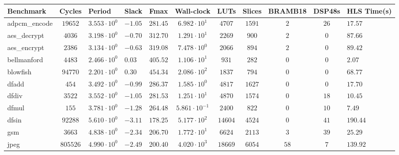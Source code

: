 \begin{tabular}{|l|c|HHc|c|c|c|c|cH|}
\hline
Benchmark     & Cycles       & Period                 & Slack     & Fmax       & Wall-clock              & LUTs      & Slices    & BRAMB18 & DSP48s  & HLS Time(s) \\
\hline
adpcm\_encode & $ 19652    $ & $ 3.553 \cdot 10^{0} $ & $ -1.05 $ & $ 281.45 $ & $ 6.982 \cdot 10^{1}  $ & $ 4707  $ & $ 1591  $ & $ 2   $ & $ 26  $ & $ 17.57   $ \\
aes\_decrypt  & $ 4036     $ & $ 3.198 \cdot 10^{0} $ & $ -0.70 $ & $ 312.70 $ & $ 1.291 \cdot 10^{1}  $ & $ 2269  $ & $ 900   $ & $ 2   $ & $ 0   $ & $ 87.66   $ \\
aes\_encrypt  & $ 2386     $ & $ 3.134 \cdot 10^{0} $ & $ -0.63 $ & $ 319.08 $ & $ 7.478 \cdot 10^{0}  $ & $ 2066  $ & $ 894   $ & $ 2   $ & $ 0   $ & $ 89.42   $ \\
bellmanford   & $ 4483     $ & $ 2.466 \cdot 10^{0} $ & $ 0.03  $ & $ 405.52 $ & $ 1.106 \cdot 10^{1}  $ & $ 931   $ & $ 282   $ & $ 0   $ & $ 0   $ & $ 2.07    $ \\
blowfish      & $ 94770    $ & $ 2.201 \cdot 10^{0} $ & $ 0.30  $ & $ 454.34 $ & $ 2.086 \cdot 10^{2}  $ & $ 1837  $ & $ 794   $ & $ 0   $ & $ 0   $ & $ 68.77   $ \\
dfadd         & $ 454      $ & $ 3.492 \cdot 10^{0} $ & $ -0.99 $ & $ 286.37 $ & $ 1.585 \cdot 10^{0}  $ & $ 4817  $ & $ 1627  $ & $ 0   $ & $ 0   $ & $ 17.70   $ \\
dfdiv         & $ 3522     $ & $ 3.552 \cdot 10^{0} $ & $ -1.05 $ & $ 281.53 $ & $ 1.251 \cdot 10^{1}  $ & $ 4870  $ & $ 1574  $ & $ 0   $ & $ 18  $ & $ 10.45   $ \\
dfmul         & $ 155      $ & $ 3.781 \cdot 10^{0} $ & $ -1.28 $ & $ 264.48 $ & $ 5.861 \cdot 10^{-1} $ & $ 2400  $ & $ 822   $ & $ 0   $ & $ 10  $ & $ 7.49    $ \\
dfsin         & $ 92288    $ & $ 5.610 \cdot 10^{0} $ & $ -3.11 $ & $ 178.25 $ & $ 5.177 \cdot 10^{2}  $ & $ 14604 $ & $ 4524  $ & $ 0   $ & $ 41  $ & $ 190.44  $ \\
gsm           & $ 3663     $ & $ 4.838 \cdot 10^{0} $ & $ -2.34 $ & $ 206.70 $ & $ 1.772 \cdot 10^{1}  $ & $ 6624  $ & $ 2113  $ & $ 3   $ & $ 39  $ & $ 25.29   $ \\
jpeg          & $ 805526   $ & $ 4.990 \cdot 10^{0} $ & $ -2.49 $ & $ 200.40 $ & $ 4.020 \cdot 10^{3}  $ & $ 18669 $ & $ 6054  $ & $ 58  $ & $ 7   $ & $ 139.92  $ \\

\end{tabular}
